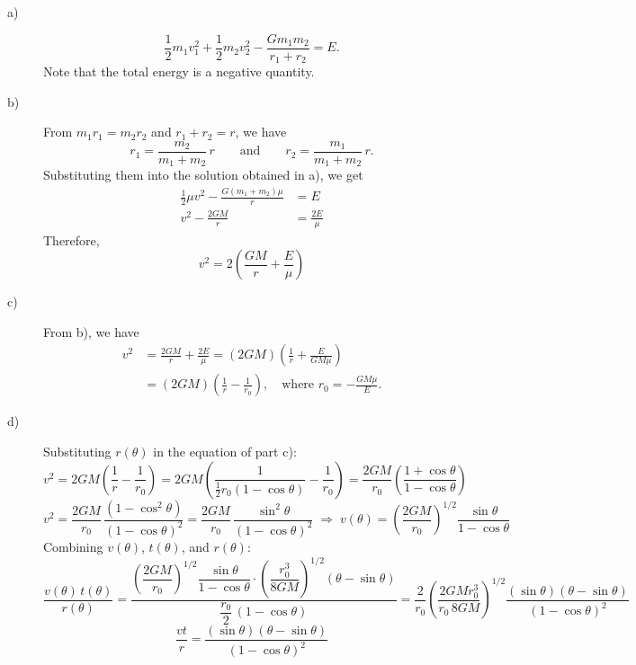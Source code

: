 \begin{description}
\item[a)]
  \begin{equation*}
  \frac{1}{2}m_1 v_1^2 + \frac{1}{2}m_2 v_2^2 - \frac{Gm_1 m_2}{r_1 + r_2} = E.
  \tag*{[5]}
  \end{equation*}
  Note that the total energy is a negative quantity.

\item[b)] From $m_1 r_1 = m_2 r_2$ and $r_1 + r_2 = r$, we have
  \[
  r_1 = \frac{m_2}{m_1 + m_2}\,r
  \qquad\text{and}\qquad
  r_2 = \frac{m_1}{m_1 + m_2}\,r.
  \]
  Substituting them into the solution obtained in a), we get
  \begin{align*}
  \frac{1}{2}\mu v^2 - \frac{G(m_1 + m_2)\mu}{r} &= E \\
  v^2 - \frac{2GM}{r} &= \frac{2E}{\mu}
  \end{align*}
  Therefore,
  \begin{equation*}
  v^2 = 2\left(\frac{GM}{r} + \frac{E}{\mu}\right)
  \tag*{[10]}
  \end{equation*}

\item[c)] From b), we have
  \begin{align*}
  v^2 &= \frac{2GM}{r} + \frac{2E}{\mu}
  = (2GM)\left(\frac{1}{r} + \frac{E}{GM\mu}\right) \\
  &= (2GM)\left(\frac{1}{r} - \frac{1}{r_0}\right),
  \quad\text{where } r_0 = -\frac{GM\mu}{E}.
  \tag*{[5]}
  \end{align*}

\item[d)] Substituting $r(\theta)$ in the equation of part c):
  \[
  v^2 = 2GM\left(\frac{1}{r} - \frac{1}{r_0}\right)
  = 2GM\left(\frac{1}{\tfrac{1}{2}r_0(1-\cos\theta)} - \frac{1}{r_0}\right)
  = \frac{2GM}{r_0}\left(\frac{1+\cos\theta}{1-\cos\theta}\right)
  \]
  \[
  v^2 = \frac{2GM}{r_0}\,\frac{(1-\cos^2\theta)}{(1-\cos\theta)^2}
  = \frac{2GM}{r_0}\,\frac{\sin^2\theta}{(1-\cos\theta)^2}
  \;\Longrightarrow\;
  v(\theta) = \left(\frac{2GM}{r_0}\right)^{1/2}\frac{\sin\theta}{1-\cos\theta}
  \]
  Combining $v(\theta)$, $t(\theta)$, and $r(\theta)$:
  \[
  \frac{v(\theta)\,t(\theta)}{r(\theta)}
  = \frac{\left(\dfrac{2GM}{r_0}\right)^{1/2}
      \dfrac{\sin\theta}{1-\cos\theta}\cdot
      \left(\dfrac{r_0^3}{8GM}\right)^{1/2}(\theta - \sin\theta)}
      {\dfrac{r_0}{2}\,(1-\cos\theta)}
  = \frac{2}{r_0}\left(\frac{2GM r_0^3}{r_0\, 8GM}\right)^{1/2}
    \frac{(\sin\theta)(\theta - \sin\theta)}{(1-\cos\theta)^2}
  \]
  \[
  \frac{vt}{r} = \frac{(\sin\theta)(\theta - \sin\theta)}{(1-\cos\theta)^2}
  \]


\end{description}
